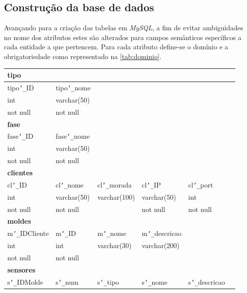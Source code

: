 \documentclass[11pt,twoside,a4paper]{report}
\begin{document}
\subsection{Construção da base de dados}
Avançando para a criação das tabelas em \textit{MySQL}, a fim de evitar ambiguidades no nome dos atributos estes são alterados para campos semânticos específicos a cada entidade a que pertencem. Para cada atributo define-se o domínio e a obrigatoriedade como representado na \autoref{tab:dominio}.
\begin{table}[H]
	\begin{tabular}{|l|l|l|l|l|l|}
		\hline
		\multicolumn{6}{|l|}{\textbf{tipo}}\\ \hline
		tipo\texttt{\char`_}ID & tipo\texttt{\char`_}nome & \multicolumn{4}{l|}{}\\ \hline
		int & varchar(50) & \multicolumn{4}{l|}{}\\ \hline
		not null & not null & \multicolumn{4}{l|}{}\\ \hline
		\multicolumn{6}{|l|}{\textbf{fase}}\\ \hline
		fase\texttt{\char`_}ID & fase\texttt{\char`_}nome & \multicolumn{4}{l|}{}\\ \hline
		int & varchar(50) & \multicolumn{4}{l|}{}\\ \hline
		not null & not null & \multicolumn{4}{l|}{}\\ \hline
		\multicolumn{6}{|l|}{\textbf{clientes}}\\ \hline
		cl\texttt{\char`_}ID & cl\texttt{\char`_}nome & cl\texttt{\char`_}morada & cl\texttt{\char`_}IP & cl\texttt{\char`_}port & \\ \hline
		int & varchar(50) & varchar(100) & varchar(50) & int & \\ \hline
		not null & not null & & not null & not null & \\ \hline
		\multicolumn{6}{|l|}{\textbf{moldes}}\\ \hline
		m\texttt{\char`_}IDCliente & m\texttt{\char`_}ID & 
		m\texttt{\char`_}nome & 
		m\texttt{\char`_}descricao & \multicolumn{2}{l|}{}\\ \hline
		int & int & varchar(30) & varchar(200) & \multicolumn{2}{l|}{}\\ \hline
		not null & not null & & &  \multicolumn{2}{l|}{}\\ \hline
		\multicolumn{6}{|l|}{\textbf{sensores}}\\ \hline
		s\texttt{\char`_}IDMolde & s\texttt{\char`_}num & s\texttt{\char`_}tipo & s\texttt{\char`_}nome & s\texttt{\char`_}descricao & \\ \hline

\end{tabular}
\end{table}
\end{document}
